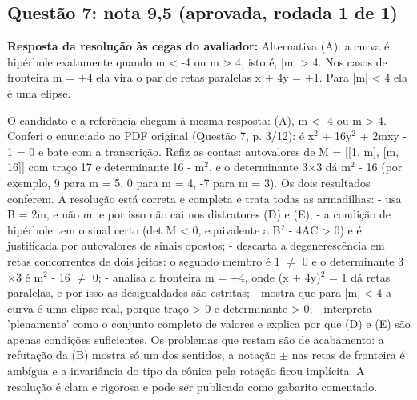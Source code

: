 \documentclass{article}%
\begin{document}
\subsection*{Questão 7: nota 9,5 (aprovada, rodada 1 de 1)}%
\textbf{Resposta da resolução às cegas do avaliador:} Alternativa (A): a curva é hipérbole exatamente quando m < -4 ou m > 4, isto é, |m| > 4. Nos casos de fronteira m = $\pm$4 ela vira o par de retas paralelas x $\pm$ 4y = $\pm$1. Para |m| < 4 ela é uma elipse.\par %
O candidato e a referência chegam à mesma resposta: (A), m < -4 ou m > 4. Conferi o enunciado no PDF original (Questão 7, p. 3/12): é x$^2$ + 16y$^2$ + 2mxy - 1 = 0 e bate com a transcrição. Refiz as contas: autovalores de M = {[}{[}1, m{]}, {[}m, 16{]}{]} com traço 17 e determinante 16 - m$^2$, e o determinante 3$\times$3 dá m$^2$ - 16 (por exemplo, 9 para m = 5, 0 para m = 4, -7 para m = 3). Os dois resultados conferem.\newline%
\newline%
A resolução está correta e completa e trata todas as armadilhas:\newline%
{-} usa B = 2m, e não m, e por isso não cai nos distratores (D) e (E);\newline%
{-} a condição de hipérbole tem o sinal certo (det M < 0, equivalente a B$^2$ - 4AC > 0) e é justificada por autovalores de sinais opostos;\newline%
{-} descarta a degenerescência em retas concorrentes de dois jeitos: o segundo membro é 1 $\neq$ 0 e o determinante 3$\times$3 é m$^2$ - 16 $\neq$ 0;\newline%
{-} analisa a fronteira m = $\pm$4, onde (x $\pm$ 4y)$^2$ = 1 dá retas paralelas, e por isso as desigualdades são estritas;\newline%
{-} mostra que para |m| < 4 a curva é uma elipse real, porque traço > 0 e determinante > 0;\newline%
{-} interpreta 'plenamente' como o conjunto completo de valores e explica por que (D) e (E) são apenas condições suficientes.\newline%
\newline%
Os problemas que restam são de acabamento: a refutação da (B) mostra só um dos sentidos, a notação $\pm$ nas retas de fronteira é ambígua e a invariância do tipo da cônica pela rotação ficou implícita. A resolução é clara e rigorosa e pode ser publicada como gabarito comentado.%
\end{document}

